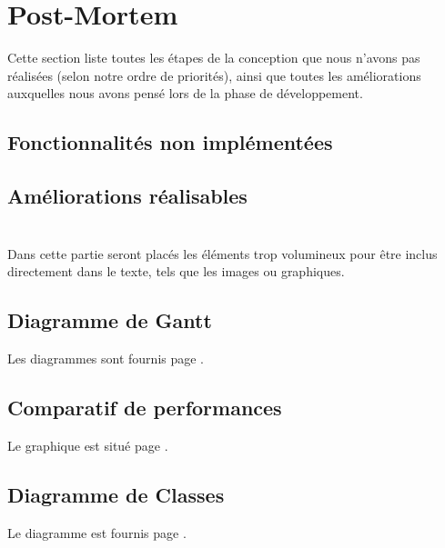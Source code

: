 \documentclass[a4paper]{memoir}
\begin{document}
	\chapter{Post-Mortem}
		Cette section liste toutes les étapes de la conception que nous n'avons pas réalisées (selon notre ordre de priorités), ainsi que toutes les 
		améliorations auxquelles nous avons pensé lors de la phase de développement.
		
		\section{Fonctionnalités non implémentées}
			
		\section{Améliorations réalisables}

	\appendix
	\chapter{}
		Dans cette partie seront placés les éléments trop volumineux pour être inclus directement dans le texte, tels que les images ou graphiques.\\
		
		\section{Diagramme de Gantt}
			Les diagrammes sont fournis page \pageref{fig:gantt}.
			
		\section{Comparatif de performances}
			Le graphique est situé page \pageref{fig:analyse}.
			
		\section{Diagramme de Classes}
			Le diagramme est fournis page \pageref{fig:diagClass}.
			
\end{document}
